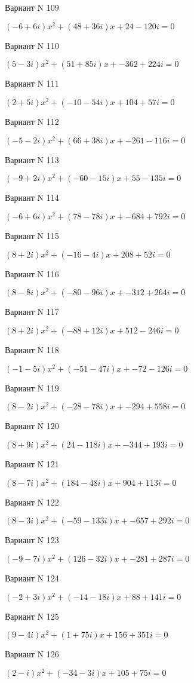 \documentclass[11pt]{report}
\begin{document}
Вариант N 109

$(-6 + 6 i)x^2 + (48 + 36 i)x + 24 - 120 i = 0$

Вариант N 110

$(5 - 3 i)x^2 + (51 + 85 i)x + -362 + 224 i = 0$

Вариант N 111

$(2 + 5 i)x^2 + (-10 - 54 i)x + 104 + 57 i = 0$

Вариант N 112

$(-5 - 2 i)x^2 + (66 + 38 i)x + -261 - 116 i = 0$

Вариант N 113

$(-9 + 2 i)x^2 + (-60 - 15 i)x + 55 - 135 i = 0$

Вариант N 114

$(-6 + 6 i)x^2 + (78 - 78 i)x + -684 + 792 i = 0$

Вариант N 115

$(8 + 2 i)x^2 + (-16 - 4 i)x + 208 + 52 i = 0$

Вариант N 116

$(8 - 8 i)x^2 + (-80 - 96 i)x + -312 + 264 i = 0$

Вариант N 117

$(8 + 2 i)x^2 + (-88 + 12 i)x + 512 - 246 i = 0$

Вариант N 118

$(-1 - 5 i)x^2 + (-51 - 47 i)x + -72 - 126 i = 0$

Вариант N 119

$(8 - 2 i)x^2 + (-28 - 78 i)x + -294 + 558 i = 0$

Вариант N 120

$(8 + 9 i)x^2 + (24 - 118 i)x + -344 + 193 i = 0$

Вариант N 121

$(8 - 7 i)x^2 + (184 - 48 i)x + 904 + 113 i = 0$

Вариант N 122

$(8 - 3 i)x^2 + (-59 - 133 i)x + -657 + 292 i = 0$

Вариант N 123

$(-9 - 7 i)x^2 + (126 - 32 i)x + -281 + 287 i = 0$

Вариант N 124

$(-2 + 3 i)x^2 + (-14 - 18 i)x + 88 + 141 i = 0$

Вариант N 125

$(9 - 4 i)x^2 + (1 + 75 i)x + 156 + 351 i = 0$

Вариант N 126

$(2 - i)x^2 + (-34 - 3 i)x + 105 + 75 i = 0$
\end{document}
